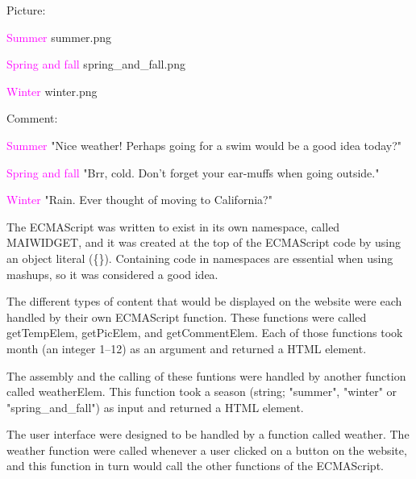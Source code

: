 \documentclass[a4paper,10pt]{article}
\begin{document}
\begin{description}
	\item Picture:
	\begin{description}
	\item \textcolor{magenta}{Summer} summer.png
	\item \textcolor{magenta}{Spring and fall} spring\_and\_fall.png
	\item \textcolor{magenta}{Winter} winter.png
	\end{description}
\end{description}

\begin{description}
	\item Comment:
	\begin{description}
	\item \textcolor{magenta}{Summer} "Nice weather! Perhaps going for a swim would be a good idea today?"
	\item \textcolor{magenta}{Spring and fall} "Brr, cold. Don't forget your ear-muffs when going outside."
	\item \textcolor{magenta}{Winter} "Rain. Ever thought of moving to California?"
	\end{description}
\end{description}

The ECMAScript was written to exist in its own namespace, called MAIWIDGET, and it was created at the top of the ECMAScript code by using an object literal (\{\}). Containing code in namespaces are essential when using mashups, so it was considered a good idea.

The different types of content that would be displayed on the website were each handled by their own ECMAScript function. These functions were called getTempElem, getPicElem, and getCommentElem. Each of those functions took month (an integer 1--12) as an argument and returned a HTML element.

The assembly and the calling of these funtions were handled by another function called weatherElem. This function took a season (string; "summer", "winter" or "spring\_and\_fall") as input and returned a HTML element.

The user interface were designed to be handled by a function called weather. The weather function were called whenever a user clicked on a button on the website, and this function in turn would call the other functions of the ECMAScript.
\end{document}
